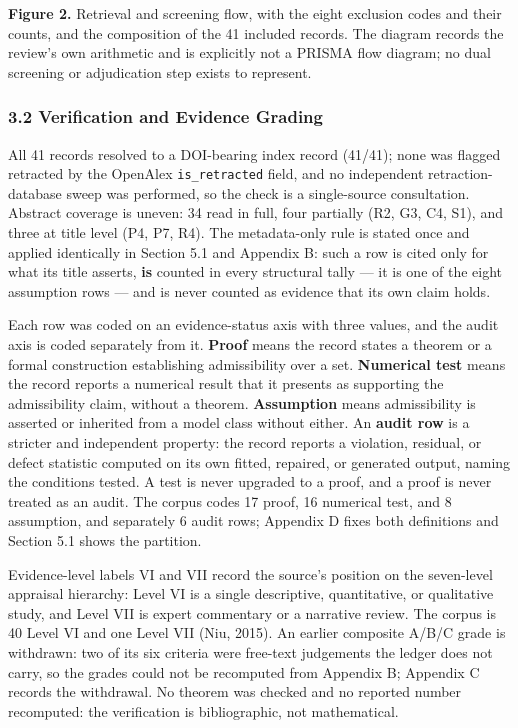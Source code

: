 \documentclass[11pt]{article}
\begin{document}
\textbf{Figure 2.} Retrieval and screening flow, with the eight exclusion codes and their counts, and the composition of the 41 included records. The diagram records the review's own arithmetic and is explicitly not a PRISMA flow diagram; no dual screening or adjudication step exists to represent.

\subsubsection*{3.2 Verification and Evidence Grading}
All 41 records resolved to a DOI-bearing index record (41/41); none was flagged retracted by the OpenAlex \texttt{is\_retracted} field, and no independent retraction-database sweep was performed, so the check is a single-source consultation. Abstract coverage is uneven: 34 read in full, four partially (R2, G3, C4, S1), and three at title level (P4, P7, R4). The metadata-only rule is stated once and applied identically in Section 5.1 and Appendix B: such a row is cited only for what its title asserts, \textbf{is} counted in every structural tally — it is one of the eight assumption rows — and is never counted as evidence that its own claim holds.

Each row was coded on an evidence-status axis with three values, and the audit axis is coded separately from it. \textbf{Proof} means the record states a theorem or a formal construction establishing admissibility over a set. \textbf{Numerical test} means the record reports a numerical result that it presents as supporting the admissibility claim, without a theorem. \textbf{Assumption} means admissibility is asserted or inherited from a model class without either. An \textbf{audit row} is a stricter and independent property: the record reports a violation, residual, or defect statistic computed on its own fitted, repaired, or generated output, naming the conditions tested. A test is never upgraded to a proof, and a proof is never treated as an audit. The corpus codes 17 proof, 16 numerical test, and 8 assumption, and separately 6 audit rows; Appendix D fixes both definitions and Section 5.1 shows the partition.

Evidence-level labels VI and VII record the source's position on the seven-level appraisal hierarchy: Level VI is a single descriptive, quantitative, or qualitative study, and Level VII is expert commentary or a narrative review. The corpus is 40 Level VI and one Level VII (Niu, 2015). An earlier composite A/B/C grade is withdrawn: two of its six criteria were free-text judgements the ledger does not carry, so the grades could not be recomputed from Appendix B; Appendix C records the withdrawal. No theorem was checked and no reported number recomputed: the verification is bibliographic, not mathematical.
\end{document}
